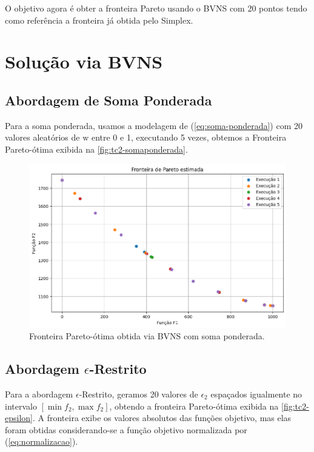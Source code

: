 \documentclass[
	12pt,				%
	oneside,			%
	a4paper,			%
	chapter=TITLE,
	sumario=tradicional,
	english,			%
	brazil				%
]{abntex2}
\begin{document}
O objetivo agora é obter a fronteira Pareto usando o BVNS com 20 pontos
tendo como referência a 
fronteira já obtida pelo Simplex.

\chapter{Solução via BVNS}\label{cap:bnvs} 

\section{Abordagem de Soma Ponderada}

Para a soma ponderada, usamos a modelagem de (\ref{eq:soma-ponderada})
com 20 valores aleatórios de $\mathrm{w}$ entre 0 e 1, 
executando 5 vezes, obtemos a Fronteira Pareto-ótima exibida na 
\autoref{fig:tc2-somaponderada}.

\begin{figure}[h!]
	\caption{\label{fig:tc2-somaponderada}Fronteira Pareto-ótima obtida via BVNS com soma ponderada.}
	\begin{center}
    \includegraphics[width=\textwidth,trim=1 1 1 1,clip]{tc2-somaponderada.png}
	\end{center}
\end{figure}

\section{Abordagem $\epsilon$-Restrito}

Para a abordagem $\epsilon$-Restrito, geramos 20 valores de 
$\epsilon_2$ espaçados igualmente no intervalo $\left[ \min f_2 , \max f_2 \right]$,
obtendo a fronteira Pareto-ótima exibida na \autoref{fig:tc2-epsilon}.
A fronteira exibe os valores absolutos das funções objetivo, mas 
elas foram obtidas considerando-se a função objetivo normalizada por 
(\ref{eq:normalizacao}).
\end{document}
